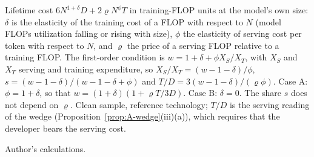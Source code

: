 \begin{table}[tp]
\centering
\caption{Sensitivity of the Revealed Share to the Cost Side}
\label{tab:app-costsens}
\footnotesize
\setlength{\tabcolsep}{4pt}
\ifdefined\ratabbox\else\newsavebox{\ratabbox}\fi
{}
\ifdim\wd\ratabbox>\textwidth\resizebox{\textwidth}{!}{\usebox{\ratabbox}}\else\usebox{\ratabbox}\fi\par
\begin{tablenotes}Lifetime cost $6N^{1+\delta}D+2\varrho N^{\phi}T$ in training-FLOP units at the model's own size: $\delta$ is the elasticity of the training cost of a FLOP with respect to $N$ (model FLOPs utilization falling or rising with size), $\phi$ the elasticity of serving cost per token with respect to $N$, and $\varrho$ the price of a serving FLOP relative to a training FLOP. The first-order condition is $w=1+\delta+\phi X_S/X_T$, with $X_S$ and $X_T$ serving and training expenditure, so $X_S/X_T=(w-1-\delta)/\phi$, $s=(w-1-\delta)/(w-1-\delta+\phi)$ and $T/D=3(w-1-\delta)/(\varrho\phi)$. Case A: $\phi=1+\delta$, so that $w=(1+\delta)(1+\varrho T/3D)$. Case B: $\delta=0$. The share $s$ does not depend on $\varrho$. Clean sample, reference technology; $T/D$ is the serving reading of the wedge (Proposition~\ref{prop:A-wedge}(iii)(a)), which requires that the developer bears the serving cost.\end{tablenotes}
\begin{tablenotes}[Source]Author's calculations.\end{tablenotes}
\end{table}
